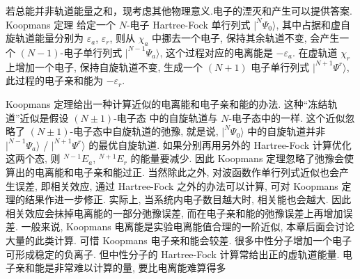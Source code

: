 \documentclass[fontset=none,12pt,a4paper]{ctexart}
\numberwithin{equation}{section}
\begin{document}
若总能并非轨道能量之和，现考虑其他物理意义.电子的湮灭和产生可以提供答案.
Koopmans 定理 给定一个 $N$-电子 Hartree-Fock 单行列式 $|^{N}\Psi_0\rangle$,
其中占据和虚自旋轨道能量分别为 $\varepsilon_a$, $\varepsilon_r$, 则从 $\chi_a$ 中挪去一个电子,
保持其余轨道不变, 会产生一个 $(N-1)$-电子单行列式 $|^{N-1}\Psi_a\rangle$, 
这个过程对应的电离能是 $-\varepsilon_a$. 在虚轨道 $\chi_r$ 上增加一个电子, 保持自旋轨道不变, 
生成一个 $(N+1)$ 电子单行列式 $|^{N+1}\Psi^r\rangle$, 此过程的电子亲和能为 $-\varepsilon_r$.

Koopmans 定理给出一种计算近似的电离能和电子亲和能的办法. 这种“冻结轨道”近似是假设 $(N \pm 1)$-电子态
中的自旋轨道与 $N$-电子态中的一样. 这个近似忽略了 $(N \pm 1)$-电子态中自旋轨道的弛豫, 
就是说, $|^{N}\Psi_0\rangle$ 中的自旋轨道并非 $|^{N-1}\Psi_a\rangle$ / $|^{N+1}\Psi^r\rangle$ 的最优自旋轨道. 
如果分别再用另外的 Hartree-Fock 计算优化这两个态, 则 $^{N-1}E_a$, $^{N+1}E_r$ 的能量要减少.
因此 Koopmans 定理忽略了弛豫会使算出的电离能和电子亲和能过正. 当然除此之外,
对波函数作单行列式近似也会产生误差, 即相关效应, 通过 Hartree-Fock 之外的办法可以计算, 
可对 Koopmans 定理的结果作进一步修正. 实际上, 当系统内电子数目越大时, 相关能也会越大. 
因此相关效应会抹掉电离能的一部分弛豫误差, 而在电子亲和能的弛豫误差上再增加误差. 一般来说, 
Koopmans 电离能是实验电离能值合理的一阶近似, 本章后面会讨论大量的此类计算.
可惜 Koopmans 电子亲和能会较差. 很多中性分子增加一个电子可形成稳定的负离子. 
但中性分子的 Hartree-Fock 计算常给出正的虚轨道能量. 电子亲和能是非常难以计算的量, 
要比电离能难算得多
\end{document}
